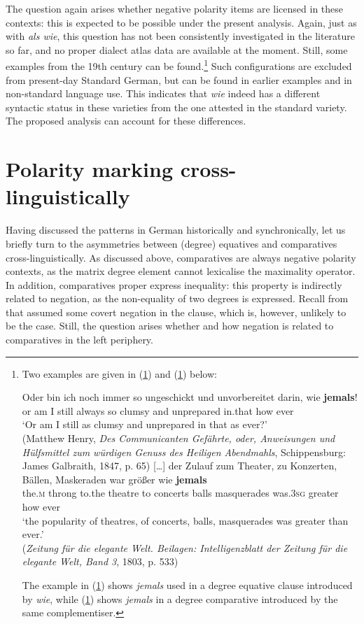 The question again arises whether negative polarity items are licensed in these contexts: this is expected to be possible under the present analysis. Again, just as with \textit{als wie}, this question has not been consistently investigated in the literature so far, and no proper dialect atlas data are available at the moment. Still, some examples from the 19th century can be found.\footnote{Two examples are given in (\ref{wiejemalsequat}) and (\ref{wiejemalscompr}) below:

\ea \gll Oder bin ich noch immer so ungeschickt und unvorbereitet darin, wie \textbf{jemals}! \label{wiejemalsequat}\\
or am I still always so clumsy and unprepared in.that how ever\\
\glt `Or am I still as clumsy and unprepared in that as ever?'\\(Matthew Henry, \textit{Des Communicanten Gefährte, oder, Anweisungen und Hülfsmittel zum würdigen Genuss des Heiligen Abendmahls}, Schippensburg: James Galbraith, 1847, p. 65)
\ex \gll {}[\ldots{}] der Zulauf zum Theater, zu Konzerten, Bällen, Maskeraden war größer wie \textbf{jemals} \label{wiejemalscompr}\\
{} the.\textsc{m} throng to.the theatre to concerts balls masquerades was.\textsc{3sg} greater how ever\\
\glt `the popularity of theatres, of concerts, balls, masquerades was greater than ever.'\\(\textit{Zeitung für die elegante Welt. Beilagen: Intelligenzblatt der Zeitung für die elegante Welt, Band 3}, 1803, p. 533)
\z

The example in (\ref{wiejemalsequat}) shows \textit{jemals} used in a degree equative clause introduced by \textit{wie}, while (\ref{wiejemalscompr}) shows \textit{jemals} in a degree comparative introduced by the same complementiser.} Such configurations are excluded from present-day Standard German, but can be found in earlier examples and in non-standard language use. This indicates that \textit{wie} indeed has a different syntactic status in these varieties from the one attested in the standard variety. The proposed analysis can account for these differences.

\section{Polarity marking cross-linguistically} \label{sec:5polaritymarking}
Having discussed the patterns in German historically and synchronically, let us briefly turn to the asymmetries between (degree) equatives and comparatives cross-linguistically. As discussed above, comparatives are always negative polarity contexts, as the matrix degree element cannot lexicalise the maximality operator. In addition, comparatives proper express inequality: this property is indirectly related to negation, as the non-equality of two degrees is expressed. Recall from  that \citet[531--532]{seuren1973} assumed some covert negation in the clause, which is, however, unlikely to be the case. Still, the question arises whether and how negation is related to comparatives in the left periphery.

